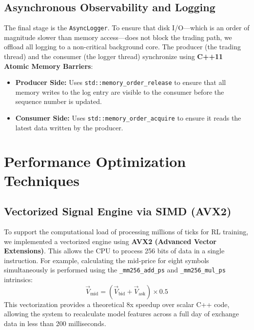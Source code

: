 \subsection{Asynchronous Observability and Logging}
The final stage is the \texttt{AsyncLogger}. To ensure that disk I/O—which is an order of magnitude slower than memory access—does not block the trading path, we offload all logging to a non-critical background core. The producer (the trading thread) and the consumer (the logger thread) synchronize using \textbf{C++11 Atomic Memory Barriers}:
\begin{itemize}
    \item \textbf{Producer Side:} Uses \texttt{std::memory\_order\_release} to ensure that all memory writes to the log entry are visible to the consumer before the sequence number is updated.
    \item \textbf{Consumer Side:} Uses \texttt{std::memory\_order\_acquire} to ensure it reads the latest data written by the producer.
\end{itemize}

\section{Performance Optimization Techniques}

\subsection{Vectorized Signal Engine via SIMD (AVX2)}
To support the computational load of processing millions of ticks for RL training, we implemented a vectorized engine using \textbf{AVX2 (Advanced Vector Extensions)}. This allows the CPU to process 256 bits of data in a single instruction. For example, calculating the mid-price for eight symbols simultaneously is performed using the \texttt{\_mm256\_add\_ps} and \texttt{\_mm256\_mul\_ps} intrinsics:
\begin{equation}
    \vec{V}_{\text{mid}} = (\vec{V}_{\text{bid}} + \vec{V}_{\text{ask}}) \times 0.5
\end{equation}
This vectorization provides a theoretical 8x speedup over scalar C++ code, allowing the system to recalculate model features across a full day of exchange data in less than 200 milliseconds. \datamethodology
